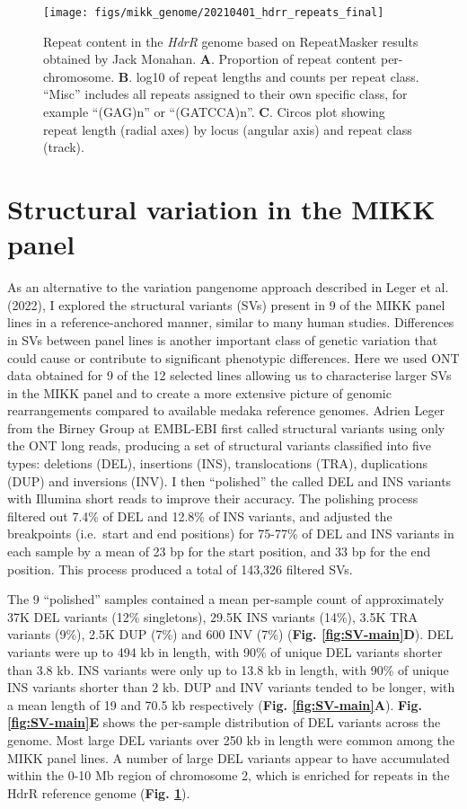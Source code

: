 \documentclass[
]{book}
\begin{document}
\begin{figure}
\texttt{[image: figs/mikk\_genome/20210401\_hdrr\_repeats\_final]} \caption{Repeat content in the \emph{HdrR} genome based on RepeatMasker results obtained by Jack Monahan. \textbf{A}. Proportion of repeat content per-chromosome. \textbf{B}. log10 of repeat lengths and counts per repeat class. ``Misc'' includes all repeats assigned to their own specific class, for example ``(GAG)n'' or ``(GATCCA)n''. \textbf{C}. Circos plot showing repeat length (radial axes) by locus (angular axis) and repeat class (track).}\label{fig:repeats}
\end{figure}

\hypertarget{mikksv-sec}{%
\section{Structural variation in the MIKK panel}\label{mikksv-sec}}

As an alternative to the variation pangenome approach described in Leger et al. (2022), I explored the structural variants (SVs) present in 9 of the MIKK panel lines in a reference-anchored manner, similar to many human studies. Differences in SVs between panel lines is another important class of genetic variation that could cause or contribute to significant phenotypic differences. Here we used ONT data obtained for 9 of the 12 selected lines allowing us to characterise larger SVs in the MIKK panel and to create a more extensive picture of genomic rearrangements compared to available medaka reference genomes. Adrien Leger from the Birney Group at EMBL-EBI first called structural variants using only the ONT long reads, producing a set of structural variants classified into five types: deletions (DEL), insertions (INS), translocations (TRA), duplications (DUP) and inversions (INV). I then ``polished'' the called DEL and INS variants with Illumina short reads to improve their accuracy. The polishing process filtered out 7.4\% of DEL and 12.8\% of INS variants, and adjusted the breakpoints (i.e.~start and end positions) for 75-77\% of DEL and INS variants in each sample by a mean of 23 bp for the start position, and 33 bp for the end position. This process produced a total of 143,326 filtered SVs.

The 9 ``polished'' samples contained a mean per-sample count of approximately 37K DEL variants (12\% singletons), 29.5K INS variants (14\%), 3.5K TRA variants (9\%), 2.5K DUP (7\%) and 600 INV (7\%) (\textbf{Fig. \ref{fig:SV-main}D}). DEL variants were up to 494 kb in length, with 90\% of unique DEL variants shorter than 3.8 kb. INS variants were only up to 13.8 kb in length, with 90\% of unique INS variants shorter than 2 kb. DUP and INV variants tended to be longer, with a mean length of 19 and 70.5 kb respectively (\textbf{Fig. \ref{fig:SV-main}A}). \textbf{Fig. \ref{fig:SV-main}E} shows the per-sample distribution of DEL variants across the genome. Most large DEL variants over 250 kb in length were common among the MIKK panel lines. A number of large DEL variants appear to have accumulated within the 0-10 Mb region of chromosome 2, which is enriched for repeats in the HdrR reference genome (\textbf{Fig. \ref{fig:repeats}}).
\end{document}
